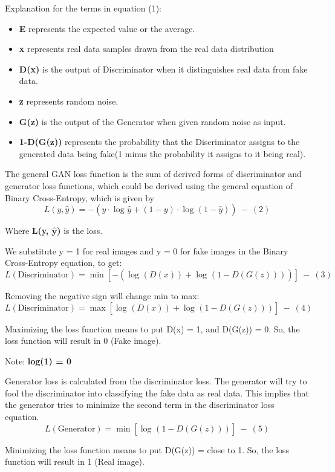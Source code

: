 \noindent
Explanation for the terms in equation (1):
\begin{itemize}
    \item \textbf{E} represents the expected value or the average.
    \item \textbf{x} represents real data samples drawn from the real data distribution 
    \item \textbf{D(x)} is the output of Discriminator when it distinguishes real data from fake data.
    \item \textbf{z} represents random noise.
    \item \textbf{G(z)} is the output of the Generator when given random noise as input.
    \item \textbf{1-D(G(z))} represents the probability that the Discriminator assigns to the generated data being fake(1 minus the probability it assigns to it being real).
\end{itemize}

\clearpage

\noindent
The general GAN loss function is the sum of derived forms of discriminator and generator loss functions, which could be derived using the general equation of Binary Cross-Entropy, which is given by
\[
L(y,\hat{y}) = -\left(y\cdot \log_{}\hat{y} + (1-y)\cdot \log_{}(1-\hat{y})\right)~-~(2)
\]

\noindent
Where \textbf{L(y, $\mathbf{\hat{y}}$)} is the loss.

\noindent
We substitute y = 1 for real images and y = 0 for fake images in the Binary Cross-Entropy equation, to get:
\[
L(\text{Discriminator}) = \min\left[-\left(\log_{}(D(x)) + \log_{}(1-D(G(z)))\right)\right]~-~(3)
\]

\noindent
Removing the negative sign will change min to max:
\[
L(\text{Discriminator}) = \max\left[\log_{}(D(x)) + \log_{}(1-D(G(z)))\right]~-~(4)
\]

\noindent
Maximizing the loss function means to put D(x) = 1, and D(G(z)) = 0. So, the loss function will result in 0 (Fake image).

\noindent
Note: \textbf{log(1) = 0}

\noindent
Generator loss is calculated from the discriminator loss. The generator will try to fool the discriminator into classifying the fake data as real data. This implies that the generator tries to minimize the second term in the discriminator loss equation.
\[
L(\text{Generator}) = \min\left[\log_{}(1-D(G(z)))\right]~-~(5)
\]

\noindent
Minimizing the loss function means to put D(G(z)) = close to 1. So, the loss function will result in 1 (Real image).\\

